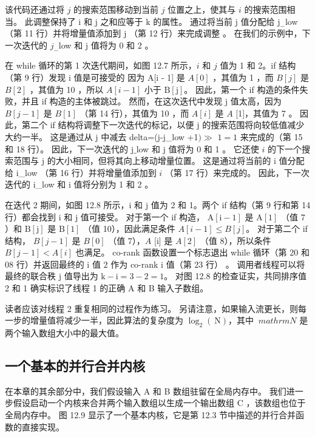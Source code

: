 该代码还通过将 $j$ 的搜索范围移动到当前 $j$ 位置之上，使其与 $i$ 的搜索范围相当。 此调整保持了 $\mathrm{i}$ 和 $\mathrm{j}$ 之和应等于 $\mathrm{k}$ 的属性。 通过将当前 $\mathrm{j}$ 值分配给 $\mathrm{j}_{-}$low （第 11 行）并将增量值添加到 $\mathrm{j}$ （第 12 行）来完成调整 。 在我们的示例中，下一次迭代的 $j_{-}$low 和 $\mathrm{j}$ 值将为 0 和 2 。

在 while 循环的第 1 次迭代期间，如图 12.7 所示，$i$ 和 $j$ 值为 1 和 2。if 结构（第 9 行）发现 $\mathrm{i}$ 值是可接受的 因为 $\mathrm{A}[\mathrm{i}$ - 1] 是 $A[0]$ ，其值为 1 ，而 $B[j]$ 是 $B[2]$ ，其值为 10 ，所以 $ A[i-1]$ 小于 $\mathrm{B}[\mathrm{j}]$。 因此，第一个 if 构造的条件失败，并且 if 构造的主体被跳过。 然而，在这次迭代中发现 $\mathrm{j}$ 值太高，因为 $B[j-1]$ 是 $B[1]$ （第 14 行），其值为 10 ，而 $A [i]$ 是 $A$ [1]，其值为 7 。 因此，第二个 if 结构将调整下一次迭代的标记，以便 $\mathrm{j}$ 的搜索范围将向较低值减少大约一半。 这是通过从 $\mathrm{j}$ 中减去 delta=(j-j\_low +1$) \gg$ $1=1$ 来完成的（第 15 和 18 行）。 因此，下一次迭代的 $\mathrm{j} \_$low 和 $\mathrm{j}$ 值将为 0 和 1 。 它还使 $i$ 的下一个搜索范围与 $\mathrm{j}$ 的大小相同，但将其向上移动增量位置。 这是通过将当前的 $\mathrm{i}$ 值分配给 i\_low （第 16 行）并将增量值添加到 $i$ （第 17 行）来完成的。 因此，下一次迭代的 i\_low 和 $\mathrm{i}$ 值将分别为 1 和 2 。

在迭代 2 期间，如图 12.8 所示，$\mathrm{i}$ 和 $\mathrm{j}$ 值为 2 和 1。两个 if 结构（第 9 行和第 14 行）都会找到 $\mathrm{i}$ 和 $\mathrm{j}$ 值可接受。 对于第一个 if 构造， $\mathrm{A}[\mathrm{i}-1]$ 是 $\mathrm{A}[1]$ （值 7 ）和 $\mathrm{B}[\mathrm{j}] $ 是 $\mathrm{B}[1]$ （值 10），因此满足条件 $A[i-1] \leq B[j]$。 对于第二个 if 结构， $B[j-1]$ 是 $B[0]$ （值 7），$A$ [i] 是 $A[2]$ （值 8），所以条件 $B [j-1]<A[i]$ 也满足。 co-rank 函数设置一个标志退出 while 循环（第 20 和 08 行）并返回最终的 $\mathrm{i}$ 值 2 作为 co-rank $\mathrm{i}$ 值（第 23 行） 。 调用者线程可以将最终的联合秩 $\mathrm{j}$ 值导出为 $\mathrm{k}-\mathrm{i}=3-2=1$。 对图 12.8 的检查证实，共同排序值 2 和 1 确实标识了线程 1 的正确 A 和 B 输入子数组。

读者应该对线程 2 重复相同的过程作为练习。 另请注意，如果输入流更长，则每一步的增量值将减少一半，因此算法的复杂度为 $\log _{2}(\mathrm{~N})$，其中 $\ mathrm{N}$ 是两个输入数组大小中的最大值。

\subsection{一个基本的并行合并内核}
在本章的其余部分中，我们假设输入 A 和 B 数组驻留在全局内存中。 我们进一步假设启动一个内核来合并两个输入数组以生成一个输出数组 $\mathrm{C}$ ，该数组也位于全局内存中。 图 12.9 显示了一个基本内核，它是第 12.3 节中描述的并行合并函数的直接实现。

